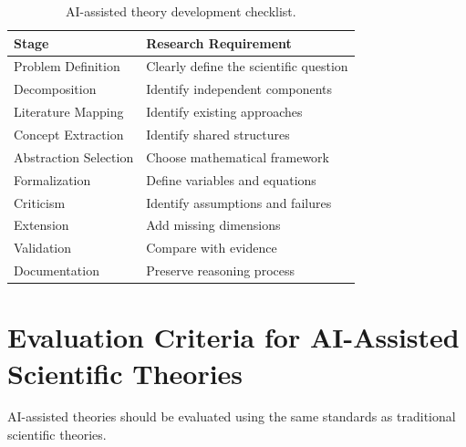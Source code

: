 \documentclass[11pt]{article}
\begin{document}
\begin{table}[h]

\centering

\begin{tabular}{ll}

\toprule

Stage & Research Requirement \\

\midrule

Problem Definition
& Clearly define the scientific question
\\

Decomposition
& Identify independent components
\\

Literature Mapping
& Identify existing approaches
\\

Concept Extraction
& Identify shared structures
\\

Abstraction Selection
& Choose mathematical framework
\\

Formalization
& Define variables and equations
\\

Criticism
& Identify assumptions and failures
\\

Extension
& Add missing dimensions
\\

Validation
& Compare with evidence
\\

Documentation
& Preserve reasoning process
\\

\bottomrule

\end{tabular}


\caption{
AI-assisted theory development checklist.
}

\end{table}



\section{Evaluation Criteria for AI-Assisted Scientific Theories}


AI-assisted theories should be evaluated using the same standards as
traditional scientific theories.
\end{document}
